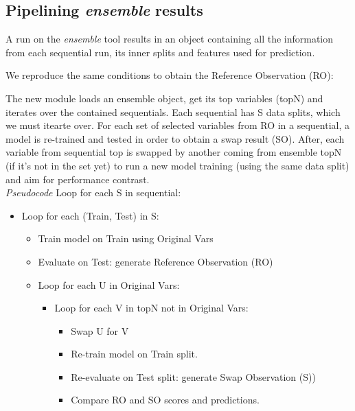 \subsection{Pipelining \emph{ensemble} results}
\label{section:methods:pipeline}
A run on the \emph{ensemble} tool results in an object containing all the information from each sequential run, its inner splits and features used for prediction.

We reproduce the same conditions to obtain the Reference Observation (RO):

The new module loads an ensemble object, get its top variables (topN) and iterates over the contained sequentials. Each sequential has S data splits, which we must itearte over. For each set of selected variables from RO in a sequential, a model is re-trained and tested in order to obtain a swap result (SO). After, each variable from sequential top is swapped by another coming from ensemble topN (if it’s not in the set yet) to run a new model training (using the same data split) and aim for performance contrast.
\\

\emph{Pseudocode}
Loop for each S in sequential:
\begin{itemize}
    \item Loop for each (Train, Test) in S:
    \begin{itemize}
        \item Train model on Train using Original Vars
        \item Evaluate on Test: generate Reference Observation (RO)
        \item Loop for each U in Original Vars:
        \begin{itemize}
            \item Loop for each V in topN not in Original Vars:
            \begin{itemize}
                \item Swap U for V
                \item Re-train model on Train split.
                \item Re-evaluate on Test split: generate Swap Observation (S))
                \item Compare RO and SO scores and predictions.
            \end{itemize}
        \end{itemize}
    \end{itemize}
\end{itemize}



